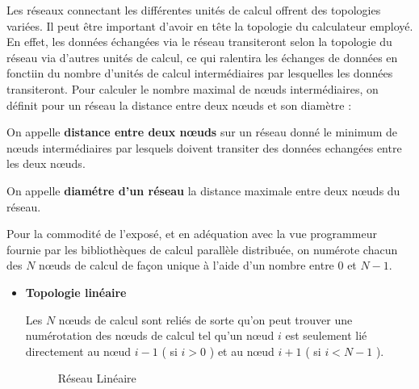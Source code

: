 \documentclass[fleqn,11pt]{article}
\begin{document}
\begin{itemize}
Les réseaux connectant les différentes unités de calcul offrent des topologies variées. Il peut être important d'avoir en tête la topologie du calculateur employé. En effet, les données échangées via le réseau transiteront selon la topologie du réseau via d'autres unités de calcul, ce qui ralentira les échanges de données en fonctiin du nombre d'unités de calcul intermédiaires par lesquelles les données transiteront. Pour calculer le nombre maximal de nœuds intermédiaires,  on définit pour un réseau la distance entre deux nœuds et son diamètre :

On appelle \textbf{distance entre deux nœuds} sur un réseau donné le minimum de nœuds
intermédiaires par lesquels doivent transiter des données echangées entre les deux
nœuds.

On appelle \textbf{diamétre d'un réseau} la distance maximale entre
deux nœuds du réseau. 

Pour la commodité de l'exposé, et en adéquation avec la vue programmeur
fournie par les bibliothèques de calcul parallèle distribuée, on numérote
chacun des $N$ nœuds de calcul de façon unique à l'aide d'un nombre entre
0 et $N-1$.

\begin{itemize}
\item \textbf{Topologie linéaire}

Les $N$ nœuds de calcul sont reliés de sorte qu'on peut trouver une numérotation
des nœuds de calcul tel qu'un nœud $i$ est seulement lié directement au
nœud $i-1$ ( si $ i > 0$ ) et au nœud $i+1$ ( si $i < N-1$ ).

\begin{figure}
\begin{center}
\end{center}
\label{fig:reslin}
\caption{Réseau Linéaire}
\end{figure}


\end{itemize}
\end{itemize}
\end{document}
